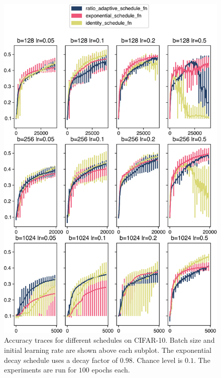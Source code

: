 \begin{figure}
    \centering
    \includegraphics[width=\linewidth]{gfx/diagrams/experiments/ratio_adaptive_accuracies.pdf}
    \caption[Accuracy traces for different schedules on CIFAR-10]{Accuracy traces
    for different schedules on CIFAR-10. Batch size and initial learning rate are
    shown above each subplot. The exponential decay schedule uses a decay factor of
    $0.98$. Chance level is $0.1$. The experiments are run for $100$ epochs
    each.}
    \label{fig:schedule-accuracies}
\end{figure}

